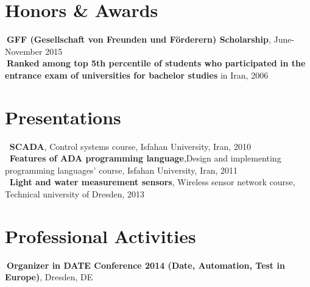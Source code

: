 \documentclass[line,margin]{res}
\begin{document}
\begin{resume}
\section{Honors \& Awards}
\textbullet$~${\bf GFF (Gesellschaft von Freunden und Förderern) Scholarship}, June-November 2015\\
\textbullet$~${\bf Ranked among top 5th percentile of students who participated in the entrance exam of universities for bachelor studies} in Iran, 2006 \\
\section{ Presentations}
\textbullet$~$ {\bf SCADA}, Control systems course, Isfahan University, Iran, 2010\\
\textbullet$~$ {\bf Features of ADA programming language},Design and implementing programming languages' course, Isfahan University, Iran, 2011\\
\textbullet$~$ {\bf Light and water measurement sensors}, Wireless sensor network course, Technical university of Dresden, 2013\\

\section{Professional Activities}
\textbullet$~${\bf Organizer in DATE Conference 2014 (Date, Automation, Test in Europe)}, Dresden, DE\\

\begin{comment}
\section{Volunteer Activities}
\textbullet$~$ Panda Seminars Co-organizer, University of Victoria\\
\textbullet$~$ Teaching Computer and Internet to Seniors (CSVP program), University of Victoria\\
\textbullet$~$ United Way Bug Push, University of Victoria\\
 \textbullet$~$ Volunteer at the CFSC Conference, Iran
\end{comment}


\end{resume}
\end{document}

